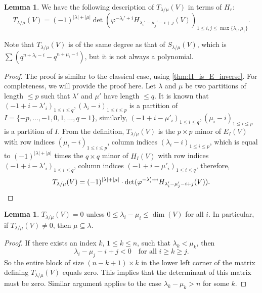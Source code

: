 \documentclass[12pt,a4paper]{report}
\theoremstyle{definition}
\newtheorem{lemma}[theorem]{Lemma}
\theoremstyle{remark}
\theoremstyle{definition}
\begin{document}
\begin{lemma}\label{lemma:define_T_as_H}
    We have the following description of $T_{\lambda/\mu}(V)$ in terms of $H_r$: 
\begin{equation}\label{eq: T in H}
T_{\lambda/\mu} (V) = (-1)^{|\lambda|+|\mu|}\det (\varphi^{-\lambda_i' +i} H_{\lambda_i' - \mu_j' - i +j}(V))_{1\leq i, j\leq \max\{\lambda_1, \mu_1\}}. 
\end{equation}
\end{lemma}
Note that $T_{\lambda/\mu}(V)$ is of the same degree as that of $S_{\lambda/\mu}(V)$, which is $\sum (q^{n+\lambda_i -i} - q^{n + \mu_i -i})$, but it is not always a polynomial.
\begin{proof}
The proof is similar to the classical case, using \cref{thm:H_is_E_inverse}. For completeness, we will provide the proof here. Let $\lambda$ and $\mu$ be two partitions of length $\leq p$ such that $\lambda'$ and $\mu'$ have length $\leq q$. It is known \cite[Chapter 1]{macdonald_symmetric_1979} that $(-1+i-\lambda'_i)_{1\leq i\leq q}, (\lambda_i-i)_{1\leq i\leq p}$ is a partition of $I=\{-p, \ldots, -1, 0, 1, \ldots, q-1\}$, similarly, $(-1+i-\mu'_i)_{1\leq i\leq q}, (\mu_i-i)_{1\leq i\leq p}$ is a partition of $I$. From the definition, $T_{\lambda/\mu}(V)$ is the $p\times p$ minor of $E_I(V)$ with row indices $(\mu_i-i)_{1\leq i\leq p}$, column indices $(\lambda_i-i)_{1\leq i\leq p}$, which is equal to $(-1)^{|\lambda|+|\mu|}$ times the $q\times q$ minor of $H_I(V)$ with row indices $(-1+i-\lambda'_i)_{1\leq i\leq q}$, column indices $(-1+i-\mu'_i)_{1\leq i\leq q}$, therefore,\begin{equation*}
    T_{\lambda/\mu}(V) = (-1)^{|\lambda|+|\mu|}\cdot\det (\varphi^{-\lambda_i' +i} H_{\lambda_i' - \mu_j' - i +j}(V)).\qedhere 
\end{equation*}
\end{proof} 
\begin{lemma}\label{lemma:T_strips}
   $T_{\lambda/\mu}(V) = 0$ unless $0 \leq \lambda_i - \mu_i \leq \dim (V)$ for all $i$. In particular, if $T_{\lambda/\mu}(V) \neq 0$, then $\mu \subseteq \lambda$.
\end{lemma}
\begin{proof}
    If there exists an index $k$, $1 \leq k \leq n$, such that $\lambda_k < \mu_k$, then
    \begin{equation*}
   \lambda_i - \mu_j -i + j < 0 \quad \text{for all $i \geq k \geq j$}.   
    \end{equation*}
    So the entire block of size $(n-k+1) \times k$ in the lower left corner of the matrix defining $T_{\lambda/\mu}(V)$ equals zero. This implies that the determinant of this matrix must be zero. Similar argument applies to the case $\lambda_k - \mu_k > n$ for some $k$.  
\end{proof}
\end{document}
